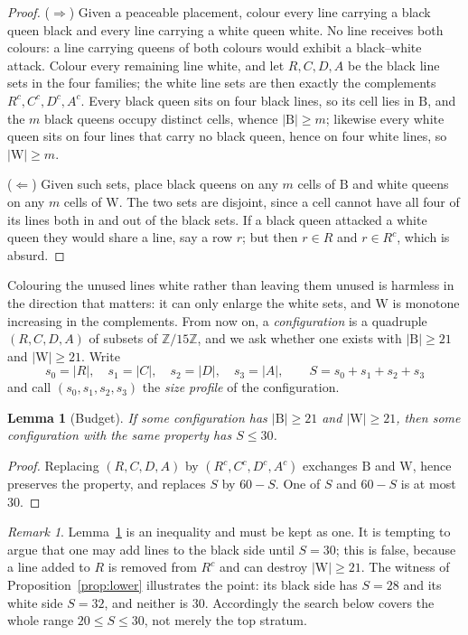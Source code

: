 \documentclass[11pt]{amsart}
\newtheorem{lemma}[theorem]{Lemma}
\theoremstyle{remark}
\newtheorem{remark}[theorem]{Remark}
\newcommand{\Z}{\mathbb{Z}}
\newcommand{\Zn}{\Z/15\Z}
\newcommand{\Bl}{\mathrm{B}}
\newcommand{\Wh}{\mathrm{W}}
\begin{document}
\begin{proof}
($\Rightarrow$) Given a peaceable placement, colour every line carrying a black queen black and every line carrying a white queen white. No line receives both colours: a line carrying queens of both colours would exhibit a black--white attack. Colour every remaining line white, and let $R,C,D,A$ be the black line sets in the four families; the white line sets are then exactly the complements $R^{c},C^{c},D^{c},A^{c}$. Every black queen sits on four black lines, so its cell lies in $\Bl$, and the $m$ black queens occupy distinct cells, whence $|\Bl|\ge m$; likewise every white queen sits on four lines that carry no black queen, hence on four white lines, so $|\Wh|\ge m$.

($\Leftarrow$) Given such sets, place black queens on any $m$ cells of $\Bl$ and white queens on any $m$ cells of $\Wh$. The two sets are disjoint, since a cell cannot have all four of its lines both in and out of the black sets. If a black queen attacked a white queen they would share a line, say a row $r$; but then $r\in R$ and $r\in R^{c}$, which is absurd.
\end{proof}

Colouring the unused lines white rather than leaving them unused is harmless in the direction that matters: it can only enlarge the white sets, and $\Wh$ is monotone increasing in the complements. From now on, a \emph{configuration} is a quadruple $(R,C,D,A)$ of subsets of $\Zn$, and we ask whether one exists with $|\Bl|\ge 21$ and $|\Wh|\ge 21$. Write
\[
s_0=|R|,\quad s_1=|C|,\quad s_2=|D|,\quad s_3=|A|,\qquad S=s_0+s_1+s_2+s_3
\]
and call $(s_0,s_1,s_2,s_3)$ the \emph{size profile} of the configuration.

\begin{lemma}[Budget]\label{lem:budget}
If some configuration has $|\Bl|\ge 21$ and $|\Wh|\ge 21$, then some configuration with the same property has $S\le 30$.
\end{lemma}

\begin{proof}
Replacing $(R,C,D,A)$ by $(R^{c},C^{c},D^{c},A^{c})$ exchanges $\Bl$ and $\Wh$, hence preserves the property, and replaces $S$ by $60-S$. One of $S$ and $60-S$ is at most $30$.
\end{proof}

\begin{remark}\label{rem:notequal}
Lemma~\ref{lem:budget} is an inequality and must be kept as one. It is tempting to argue that one may add lines to the black side until $S=30$; this is false, because a line added to $R$ is removed from $R^{c}$ and can destroy $|\Wh|\ge 21$. The witness of Proposition~\ref{prop:lower} illustrates the point: its black side has $S=28$ and its white side $S=32$, and neither is $30$. Accordingly the search below covers the whole range $20\le S\le 30$, not merely the top stratum.
\end{remark}
\end{document}

